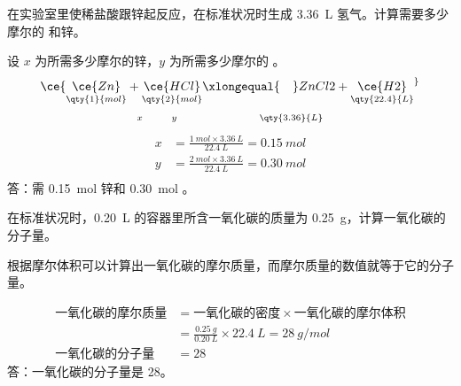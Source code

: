 \begin{example}
  在实验室里使稀盐酸跟锌起反应，在标准状况时生成 \qty{3.36}{L} 氢气。计算需要多少摩尔的  和锌。
\end{example}
\begin{solution}
  设 $x$ 为所需多少摩尔的锌，$y$ 为所需多少摩尔的 。
  \begin{gather*} 
    \ce{\underset{\qty{1}{mol}}{\ce{Zn}} + \underset{\qty{2}{mol}}{\ce{HCl}} \xlongequal{\quad} ZnCl2 + \underset{\qty{22.4}{L}}{\ce{H2}} ^} \\
   \scriptstyle x\quad\quad\ y \qquad\qquad\ \ \qquad \qty{3.36}{L}
  \end{gather*}
  \[\begin{split} 
    x & = \frac{\qty{1}{mol}\times\qty{3.36}{L}}{\qty{22.4}{L}} = \qty{0.15}{mol}\\
    y & = \frac{\qty{2}{mol}\times\qty{3.36}{L}}{\qty{22.4}{L}} = \qty{0.30}{mol}\\
  \end{split}\]
  答：需 \qty{0.15}{mol} 锌和 \qty{0.30}{mol} 。
\end{solution}

\begin{example}
  在标准状况时，\qty{0.20}{L} 的容器里所含一氧化碳的质量为 \qty{0.25}{g}，计算一氧化碳的分子量。
\end{example}

根据摩尔体积可以计算出一氧化碳的摩尔质量，而摩尔质量的数值就等于它的分子量。

\begin{solution}
  \[\begin{split}
    \text{一氧化碳的摩尔质量} & = \text{一氧化碳的密度} \times \text{一氧化碳的摩尔体积}\\
    & = \frac{\qty{0.25}{g}}{\qty{0.20}{L}} \times \qty{22.4}{L} = \qty{28}{g/mol}\\ 
    \text{一氧化碳的分子量} & = 28
  \end{split}\]
  答：一氧化碳的分子量是 28。
\end{solution}

